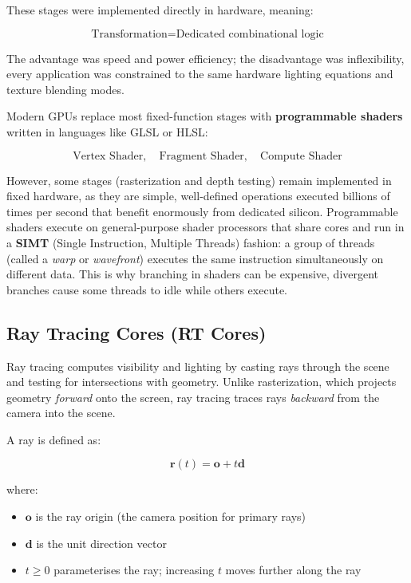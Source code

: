 \documentclass[11pt]{article}
\begin{document}
These stages were implemented directly in hardware, meaning:

\begin{equation}
    \text{Transformation} = \text{Dedicated combinational logic}
\end{equation}

The advantage was speed and power efficiency; the disadvantage was inflexibility, every application was constrained to the same hardware lighting equations and texture blending modes.

Modern GPUs replace most fixed-function stages with \textbf{programmable shaders} written in languages like GLSL or HLSL:

\begin{equation}
    \text{Vertex Shader}, \quad \text{Fragment Shader}, \quad \text{Compute Shader}
\end{equation}

However, some stages (rasterization and depth testing) remain implemented in fixed hardware, as they are simple, well-defined operations executed billions of times per second that benefit enormously from dedicated silicon. Programmable shaders execute on general-purpose shader processors that share cores and run in a \textbf{SIMT} (Single Instruction, Multiple Threads) fashion: a group of threads (called a \emph{warp} or \emph{wavefront}) executes the same instruction simultaneously on different data. This is why branching in shaders can be expensive, divergent branches cause some threads to idle while others execute.

\subsection{Ray Tracing Cores (RT Cores)}

Ray tracing computes visibility and lighting by casting rays through the scene and testing for intersections with geometry. Unlike rasterization, which projects geometry \emph{forward} onto the screen, ray tracing traces rays \emph{backward} from the camera into the scene.

A ray is defined as:

\begin{equation}
    \mathbf{r}(t) = \mathbf{o} + t \mathbf{d}
\end{equation}

where:
\begin{itemize}
    \item $\mathbf{o}$ is the ray origin (the camera position for primary rays)
    \item $\mathbf{d}$ is the unit direction vector
    \item $t \ge 0$ parameterises the ray; increasing $t$ moves further along the ray
\end{itemize}
\end{document}
